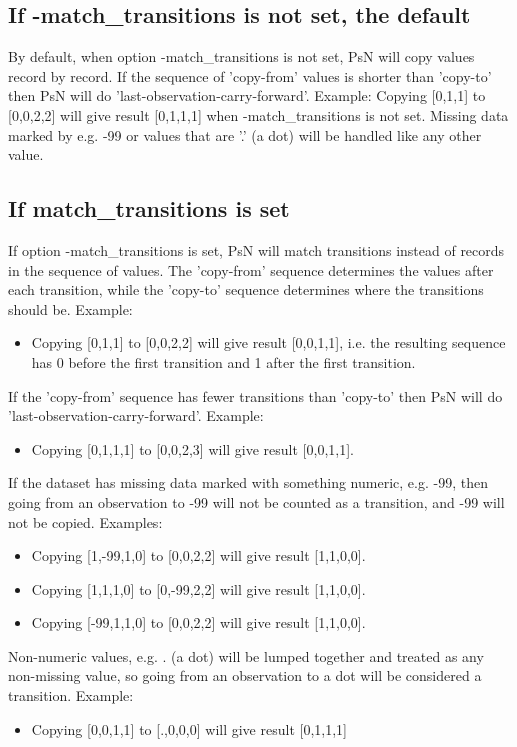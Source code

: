 \subsection{If -match\_transitions is not set, the default}

By default, when option -match\_transitions is not set, PsN will copy values record by record. If the sequence of 'copy-from' values is shorter than 'copy-to' then PsN will do 'last-observation-carry-forward'. Example: 
Copying [0,1,1] to [0,0,2,2] will give result [0,1,1,1] when -match\_transitions is not set. Missing data marked by e.g. -99 or values that are '.' (a dot) will be handled like any other value. 

\subsection{If match\_transitions is set}

If option -match\_transitions is set, PsN will match transitions instead of records in the sequence of values. The 'copy-from' sequence determines the values after each transition, while the 'copy-to' sequence determines where the transitions should be. Example: 
\begin{itemize}
\item Copying [0,1,1] to [0,0,2,2] will give result [0,0,1,1], i.e. the resulting sequence has 0 before the first transition and 1 after the first transition. 
\end{itemize}

\noindent If the 'copy-from' sequence has fewer transitions than 'copy-to' then PsN will do 'last-observation-carry-forward'. Example:
\begin{itemize}
\item Copying [0,1,1,1] to [0,0,2,3] will give result [0,0,1,1]. 
\end{itemize}
\noindent If the dataset has missing data marked with something numeric, e.g. -99, then going from an observation to -99 will not be counted as a transition, and -99 will not be copied. Examples:
\begin{itemize}
\item Copying [1,-99,1,0] to [0,0,2,2] will give result [1,1,0,0]. 
\item Copying [1,1,1,0] to [0,-99,2,2] will give result [1,1,0,0].
\item Copying [-99,1,1,0] to [0,0,2,2] will give result [1,1,0,0]. 
\end{itemize}

\noindent Non-numeric values, e.g. . (a dot) will be lumped together and treated as any non-missing value, so going from an observation to a dot will be considered a transition. Example:
\begin{itemize}
\item Copying [0,0,1,1] to  [.,0,0,0] will give result [0,1,1,1] 
\end{itemize}

